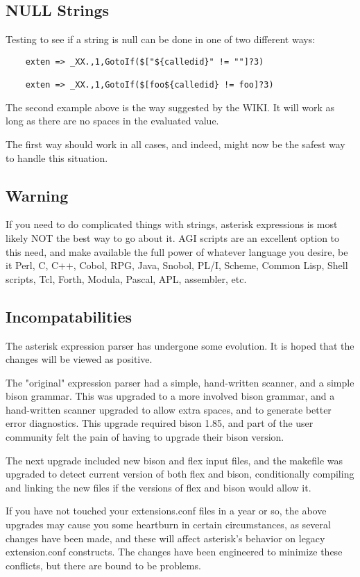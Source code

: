 \subsection{NULL Strings}
Testing to see if a string is null can be done in one of two different ways:
\begin{verbatim}
	exten => _XX.,1,GotoIf($["${calledid}" != ""]?3) 

	exten => _XX.,1,GotoIf($[foo${calledid} != foo]?3) 
\end{verbatim}

The second example above is the way suggested by the WIKI. It will 
work as long as there are no spaces in the evaluated value.

The first way should work in all cases, and indeed, might now
be the safest way to handle this situation.

\subsection{Warning}

If you need to do complicated things with strings, asterisk expressions
is most likely NOT the best way to go about it. AGI scripts are an
excellent option to this need, and make available the full power of
whatever language you desire, be it Perl, C, C++, Cobol, RPG, Java,
Snobol, PL/I, Scheme, Common Lisp, Shell scripts, Tcl, Forth, Modula,
Pascal, APL, assembler, etc.

\subsection{Incompatabilities}

The asterisk expression parser has undergone some evolution. It is hoped
that the changes will be viewed as positive. 

The "original" expression parser had a simple, hand-written scanner,
and a simple bison grammar. This was upgraded to a more involved bison
grammar, and a hand-written scanner upgraded to allow extra spaces,
and to generate better error diagnostics. This upgrade required bison
1.85, and part of the user community felt the pain of having to
upgrade their bison version.

The next upgrade included new bison and flex input files, and the makefile
was upgraded to detect current version of both flex and bison, conditionally
compiling and linking the new files if the versions of flex and bison would
allow it.

If you have not touched your extensions.conf files in a year or so, the
above upgrades may cause you some heartburn in certain circumstances, as
several changes have been made, and these will affect asterisk's behavior on 
legacy extension.conf constructs.  The changes have been engineered
to minimize these conflicts, but there are bound to be problems.

